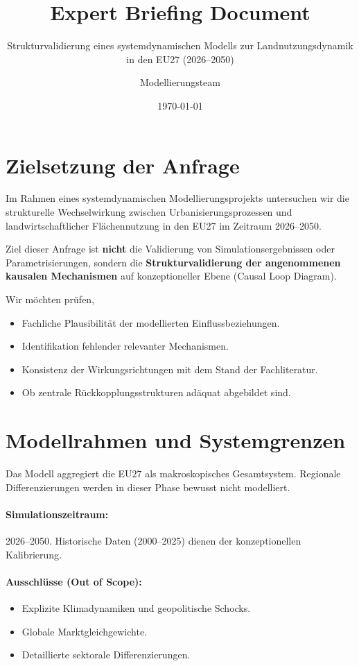 \documentclass[11pt, a4paper, oneside]{scrartcl}
\title{Expert Briefing Document}
\subtitle{Strukturvalidierung eines systemdynamischen Modells zur Landnutzungsdynamik in den EU27 (2026--2050)}
\author{Modellierungsteam}
\date{\today}
\begin{document}
\maketitle
\newpage

\section{Zielsetzung der Anfrage}
Im Rahmen eines systemdynamischen Modellierungsprojekts untersuchen wir die strukturelle Wechselwirkung zwischen Urbanisierungsprozessen und landwirtschaftlicher Flächennutzung in den EU27 im Zeitraum 2026--2050.

Ziel dieser Anfrage ist \textbf{nicht} die Validierung von Simulationsergebnissen oder Parametrisierungen, sondern die \textbf{Strukturvalidierung der angenommenen kausalen Mechanismen} auf konzeptioneller Ebene (Causal Loop Diagram). 

Wir möchten prüfen,
\begin{itemize}
  \item Fachliche Plausibilität der modellierten Einflussbeziehungen.
  \item Identifikation fehlender relevanter Mechanismen.
  \item Konsistenz der Wirkungsrichtungen mit dem Stand der Fachliteratur.
  \item Ob zentrale Rückkopplungsstrukturen adäquat abgebildet sind. 
\end{itemize}

\section{Modellrahmen und Systemgrenzen}
Das Modell aggregiert die EU27 als makroskopisches Gesamtsystem. Regionale Differenzierungen werden in dieser Phase bewusst nicht modelliert.

\paragraph{Simulationszeitraum:} 2026--2050. Historische Daten (2000--2025) dienen der konzeptionellen Kalibrierung.

\paragraph{Ausschlüsse (Out of Scope):}
\begin{itemize}
  \item Explizite Klimadynamiken und geopolitische Schocks.
  \item Globale Marktgleichgewichte.
  \item Detaillierte sektorale Differenzierungen.
\end{itemize}
\end{document}

